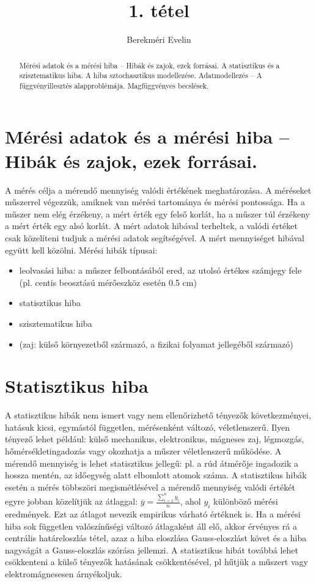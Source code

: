 \documentclass[12pt]{article}
\theoremstyle{plain}
\begin{document}
\title{\textbf{1. tétel}}
\author{Berekméri Evelin}

\maketitle


\newpage
\begin{abstract}
    Mérési adatok és a mérési hiba – Hibák és zajok, ezek forrásai. A statisztikus és a szisztematikus hiba. A hiba sztochasztikus modellezése. Adatmodellezés – A függvényillesztés alapproblémája. Magfüggvényes becslések.
\end{abstract}

\section*{Mérési adatok és a mérési hiba – Hibák és zajok, ezek forrásai.}
A mérés célja a mérendő mennyiség valódi értékének meghatározása. A méréseket műszerrel végezzük, amiknek van mérési tartománya és mérési pontossága. Ha a műszer nem elég érzékeny, a mért érték egy felső korlát, ha a műszer túl érzékeny a mért érték egy alsó korlát. A mért adatok hibával terheltek, a valódi értéket csak közelíteni tudjuk a mérési adatok segítségével.  A mért mennyiséget hibával együtt kell közölni. Mérési hibák típusai:
\begin{itemize}
    \item leolvasási hiba: a műszer felbontásából ered, az utolsó értékes számjegy fele (pl. centis beosztású mérőeszköz esetén 0.5 cm)
    \item statisztikus hiba
    \item szisztematikus hiba
    \item (zaj: külső környezetből származó, a fizikai folyamat jellegéből származó)
\end{itemize}

\section*{Statisztikus hiba}
A statisztikus hibák nem ismert vagy nem ellenőrizhető tényezők következményei, hatásuk kicsi, egymástól független, mérésenként változó, véletlenszerű. Ilyen tényező lehet például: külső mechanikus, elektronikus, mágneses zaj, légmozgás, hőmérsékletingadozás vagy okozhatja a műszer véletlenszerű működése. A mérendő mennyiség is lehet statisztikus jellegű: pl. a rúd átmérője ingadozik a hossza mentén, az időegység alatt elbomlott atomok száma. A statisztikus hibák esetén a mérés többszöri megismétlésével a mérendő mennyiség valódi értékét egyre jobban közelítjük az átlaggal: $\overline{y} = \frac{\sum_{i=1}^{n} y_i}{n}$, ahol $y_i$ különböző mérési eredmények. Ezt az átlagot nevezik empirikus várható értéknek is.  Ha a mérési hiba sok független valószínűségi változó átlagaként áll
elő, akkor érvényes rá a centrális határeloszlás tétel, azaz a hiba eloszlása Gauss-eloszlást követ és a hiba nagyságát a Gauss-eloszlás szórása jellemzi. A statisztikus hibát továbbá lehet csökkenteni a külső tényezők hatásának csökkentésével, pl hűtjük a műszert vagy elektromágnesesen árnyékoljuk.
\end{document}

